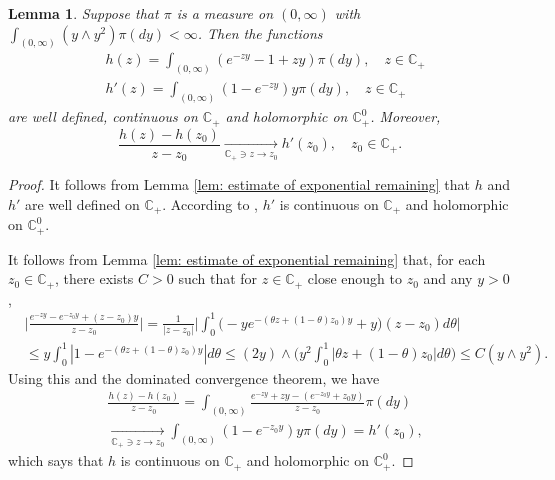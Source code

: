 \documentclass[12pt,a4paper]{amsart}
\theoremstyle{plain}
\newtheorem{lem}[thm]{Lemma}
\theoremstyle{definition}
\numberwithin{equation}{section}
\begin{document}
\begin{lem}
\label{lem: extension lemma for branching mechanism}
    Suppose that  $\pi$ is a measure on $(0,\infty)$ with $\int_{(0,\infty)} (y \wedge y^2) \pi(dy)< \infty$.
    Then the functions
\begin{align*}
&
    h (z) = \int_{(0,\infty)} (e^{-zy} - 1 + zy) \pi(dy), \quad z \in \mathbb C_+
\\&
    h'(z) = \int_{(0,\infty)}(1- e^{-zy})y \pi(dy), \quad z \in \mathbb C_+
\end{align*}
    are well defined, continuous on $\mathbb C_+$ and holomorphic on $\mathbb C_+^0$.
    Moreover,
\[
    \frac{h(z)-h(z_0)}{z-z_0} \xrightarrow[\mathbb C_+\ni z \to z_0]{} h'(z_0),\quad z_0 \in \mathbb C_+.
\]
\end{lem}
\begin{proof}
    It follows from Lemma \ref{lem: estimate of exponential remaining} that $h$ and $h'$ are well defined on $\mathbb C_+$.
   According to \cite[Theorems 3.2. \& Proposition 3.6]{SchillingSongVondravcek2010Bernstein},
    $h'$ is continuous on $\mathbb C_+$ and holomorphic on $\mathbb C_+^0$.

    It follows from Lemma \ref{lem: estimate of exponential remaining} that, for each $z_0 \in \mathbb C_+$,  there exists $C>0$ such that for $z \in \mathbb C_+$ close enough to $z_0$ and any
    $y>0$,
\begin{align}
    &\Big| \frac{e^{-zy} - e^{-z_0 y}+(z-z_0) y}{z-z_0} \Big|
    = \frac{1}{|z-z_0|}\Big| \int_0^1 \big(-y e^{-(\theta z+(1-\theta)z_0)y}+y\big)(z-z_0)d\theta\Big|
    \\ &\leq y\int_0^1 |1-e^{-(\theta z +(1-\theta)z_0)y}| d\theta
    \leq (2y) \wedge\Big( y^2\int_0^1|\theta z+(1-\theta)z_0|d\theta\Big)
    \leq C(y\wedge y^2).
\end{align}
    Using this and the dominated convergence theorem, we have
\begin{align}
    &\frac{h(z)-h(z_0)}{z-z_0} = \int_{(0,\infty)} \frac{e^{-zy}+zy -(e^{-z_0 y}+z_0 y)}{z-z_0}  \pi(dy)
    \\&\xrightarrow[\mathbb C_+\ni z\to z_0]{} \int_{(0,\infty)}(1 - e^{-z_0 y} )y\pi(dy) = h'(z_0),
\end{align}
    which says that $h$ is continuous on $\mathbb C_+$ and holomorphic on $\mathbb C_+^0$.
\end{proof}
\end{document}
